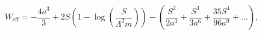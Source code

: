 \begin{equation}
        W_{\mathrm{eff}} = -\frac{4 a^3}{3} + 2 S \left (1-\log \left ( \frac{S}{\Lambda^2 m} \right ) \right ) - \left (\frac{S^2}{2a^3}+\frac{S^3}{3 a^6} + \frac{35 S^4}{96 a^9} + \ldots \right ),
        \label{eq:semiclassU2expansion}
\end{equation}

